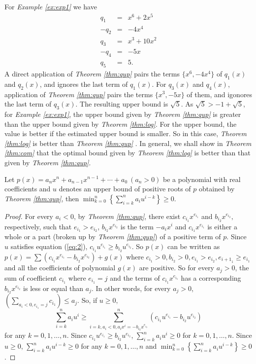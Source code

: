 For {\em Example \ref{ex:exp1}} we have
  \begin{eqnarray*}
 q_1&=&x^6+2x^5\\  	
 -q_2&=& -4x^4\\
 q_3&=& x^3+10x^2\\
 -q_4&=& -5x\\
 q_5&=&5.
  	\end{eqnarray*}
A direct application of {\em Theorem \ref{thm:qup}} pairs the terms $\{x^6, -4x^4\}$ of $q_1(x)$ and $q_2(x)$, and ignores the last term
  	of $q_1(x)$. For $q_3(x)$ and $q_4(x)$,   application of {\em Theorem \ref{thm:qup}} pairs the terms $\{x^3, -5x\}$ of them, and igonores the last  term of $q_3(x)$. The resulting upper bound is $\sqrt{5}$. As $\sqrt{5}> -1+\sqrt{5}$, for {\em Example \ref{ex:exp1}}, the upper bound given by {\em Theorem \ref{thm:qup}} is greater than  the upper bound given by {\em Theorem \ref{thm:log}}. For the upper bound, the value is better if the estimated upper bound is smaller. So in this case,  {\em Theorem \ref{thm:log}} is better than   {\em Theorem \ref{thm:qup}} . In general, we shall show in {\em Theorem \ref{thm:com}} that the optimal bound given by {\em Theorem \ref{thm:log}} is better than that given by {\em Theorem \ref{thm:qup}}.

\begin{theorem}\label{thm:com}
	Let $p(x)=a_nx^n+a_{n-1}x^{n-1}+\cdots+a_0\ (a_n>0)$ be a polynomial with real coefficients and $u$ denotes an upper bound of positive roots of $p$ obtained by {\em Theorem \ref{thm:qup}}, then $\min_{k=0}^{n}\left\{  \sum_{i=k}^n a_i u^{i-k}\right\}\ge0$.
	
\end{theorem}
\begin{proof}

	For every $ a_i<0$, by {\em Theorem \ref{thm:qup}}, there exist  $c_{i_1}x^{e_{i_1}}$ and $b_{i_2}x^{e_{i_2}},$  respectively, such that
	$e_{i_1}>e_{i_2}$, $b_{i_2}x^{e_{i_2} }$ is the term $-a_ix^i$
	and $c_{i_1}x^{e_{i_1} }$ is either a whole or a part (broken up by {\em Theorem \ref{thm:qup}}) of a positive term of $p$. Since $u$ satisfies equation (\ref{eq:2}),
	 $c_{i_1}u^{e_{i_1}}\ge b_{i_2}u^{e_{i_2}}$.
So $p(x)$ can be written as $p(x)=\sum (c_{i_1}x^{e_{i_1}}-b_{i_2}x^{e_{i_2}})+g(x)$ where $c_{i_1}> 0,b_{i_2}>0,e_{i_1}> e_{i_2}, e_{{i+1}_1}\ge e_{i_1} $  and all the coefficients of polynomial $g(x)$ are positive.
	 So for  every  $a_j>0$, the sum of coefficient $c_{i_1}$ where  $e_{i_1}=j$ and  the terms of $c_{i_1}x^{e_{i_1}}$    has a corresponding $ b_{i_2}x^{e_{i_2}}$ is less or equal than $a_j$. In other words,
	for every  $a_j>0$,   $\left( \sum_{a_i<0,e_{i_1}=j }c_{i_1} \right)\le a_{j}$. So, if $u\ge0,$
	\[\sum_{i=k}^na_iu^i\ge \sum_{i=k,a_i<0, a_ix^i=-b_{i_2}x^{e_{i_2}}  }^n \left( c_{i_1}u^{e_{i_1}}-
		b_{i_2}u^{e_{i_2}} \right) \] for any $k= 0,1,\ldots,n$.  Since  $c_{i_1}u^{e_{i_1}}\ge b_{i_2}u^{e_{i_2}}$, $\sum_{i=k}^na_iu^i\ge 0$ for
	 $k= 0,1,\ldots,n$. Since $u\ge0$,  $\sum_{i=k}^n a_i u^{i-k}\ge0 $ for any  $k= 0,1,\ldots,n$ and
	$\min_{k=0}^{n}\left\{  \sum_{i=k}^n a_i u^{i-k}\right\}\ge0$.
\end{proof}


